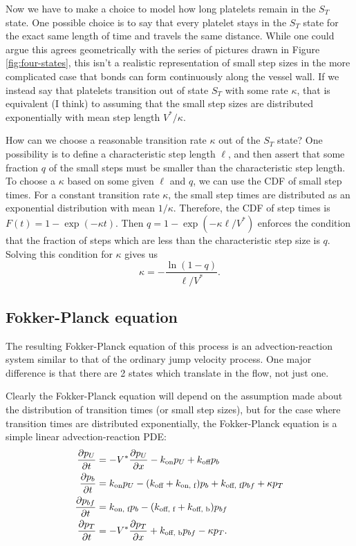 \documentclass{article}
\newcommand{\tn}{\textnormal}
\newcommand{\Pder}[2]{\frac{\partial #1}{\partial #2}}
\begin{document}
Now we have to make a choice to model how long platelets remain in the
$S_T$ state. One possible choice is to say that every platelet stays
in the $S_T$ state for the exact same length of time and travels the
same distance. While one could argue this agrees geometrically with
the series of pictures drawn in Figure \ref{fig:four-states}, this
isn't a realistic representation of small step sizes in the more
complicated case that bonds can form continuously along the vessel
wall. If we instead say that platelets transition out of state $S_T$
with some rate $\kappa$, that is equivalent (I think) to assuming
that the small step sizes are distributed exponentially with mean step
length $V^*/\kappa$.

How can we choose a reasonable transition rate $\kappa$ out of the
$S_T$ state? One possibility is to define a characteristic step length
$\ell$, and then assert that some fraction $q$ of the small steps must
be smaller than the characteristic step length. To choose a $\kappa$
based on some given $\ell$ and $q$, we can use the CDF of small step
times. For a constant transition rate $\kappa$, the small step times
are distributed as an exponential distribution with mean
$1/\kappa$. Therefore, the CDF of step times is
$F(t) = 1 - \exp(-\kappa t)$. Then $q = 1 - \exp(-\kappa \ell/V^*)$
enforces the condition that the fraction of steps which are less than
the characteristic step size is $q$. Solving this condition for
$\kappa$ gives us
\begin{equation}
  \label{eq:kappa-defn}
  \kappa = -\frac{\ln(1 - q)}{\ell/V^*}.
\end{equation}

\subsection{Fokker-Planck equation}
\label{sec:fokk-planck-equat}

The resulting Fokker-Planck equation of this process is an
advection-reaction system similar to that of the ordinary jump
velocity process. One major difference is that there are 2 states
which translate in the flow, not just one.

Clearly the Fokker-Planck equation will depend on the assumption made
about the distribution of transition times (or small step sizes), but
for the case where transition times are distributed exponentially, the
Fokker-Planck equation is a simple linear advection-reaction PDE:
\begin{align}
  \Pder{p_U}{t} &= -V^* \Pder{p_U}{x} - k_\tn{on} p_U + k_\tn{off} p_b
  \\
  \Pder{p_b}{t} &= k_\tn{on} p_U - (k_\tn{off} + k_\tn{on, f}) p_b +
                  k_\tn{off, f} p_{bf} + \kappa p_T \\
  \Pder{p_{bf}}{t} &= k_\tn{on, f} p_b - (k_\tn{off, f} + k_\tn{off,
                     b}) p_{bf} \\
  \Pder{p_T}{t} &= -V^* \Pder{p_T}{x} + k_\tn{off, b} p_{bf} - \kappa
                  p_T.
\end{align}
\end{document}
